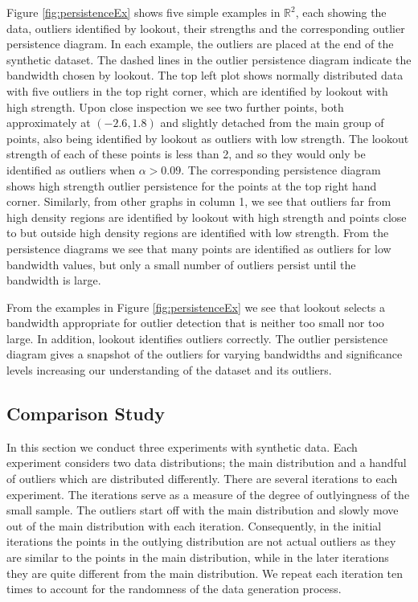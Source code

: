 \documentclass[12pt]{article}
\theoremstyle{definition}
\theoremstyle{definition}
\theoremstyle{definition}
\theoremstyle{definition}
\theoremstyle{remark}
\begin{document}
Figure \ref{fig:persistenceEx} shows five simple examples in \(\mathbb{R}^2\), each showing the data, outliers identified by lookout, their strengths and the corresponding outlier persistence diagram. In each example, the outliers are placed at the end of the synthetic dataset. The dashed lines in the outlier persistence diagram indicate the bandwidth chosen by lookout. The top left plot shows normally distributed data with five outliers in the top right corner, which are identified by lookout with high strength. Upon close inspection we see two further points, both approximately at \((-2.6, 1.8)\) and slightly detached from the main group of points, also being identified by lookout as outliers with low strength. The lookout strength of each of these points is less than 2, and so they would only be identified as outliers when \(\alpha > 0.09\). The corresponding persistence diagram shows high strength outlier persistence for the points at the top right hand corner. Similarly, from other graphs in column 1, we see that outliers far from high density regions are identified by lookout with high strength and points close to but outside high density regions are identified with low strength. From the persistence diagrams we see that many points are identified as outliers for low bandwidth values, but only a small number of outliers persist until the bandwidth is large.

From the examples in Figure \ref{fig:persistenceEx} we see that lookout selects a bandwidth appropriate for outlier detection that is neither too small nor too large. In addition, lookout identifies outliers correctly. The outlier persistence diagram gives a snapshot of the outliers for varying bandwidths and significance levels increasing our understanding of the dataset and its outliers.

\hypertarget{sec:SyntheticComparison}{%
\subsection{Comparison Study}\label{sec:SyntheticComparison}}

In this section we conduct three experiments with synthetic data. Each experiment considers two data distributions; the main distribution and a handful of outliers which are distributed differently. There are several iterations to each experiment. The iterations serve as a measure of the degree of outlyingness of the small sample. The outliers start off with the main distribution and slowly move out of the main distribution with each iteration. Consequently, in the initial iterations the points in the outlying distribution are not actual outliers as they are similar to the points in the main distribution, while in the later iterations they are quite different from the main distribution. We repeat each iteration ten times to account for the randomness of the data generation process.
\end{document}
